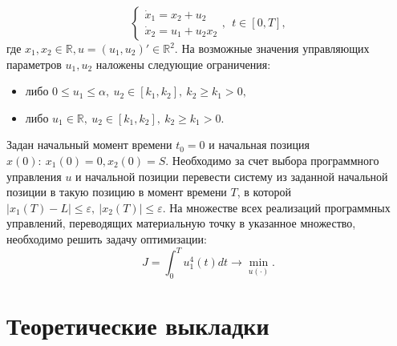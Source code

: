 \documentclass{article}
\begin{document}
\begin{equation}
\label{eq:1}
\begin{cases}
    \dot{x}_1 = x_2+u_2\\
    \dot{x}_2 = u_1+u_2x_2
\end{cases},
~~t\in[0,T],
\end{equation}
где $x_1, x_2 \in \mathbb{R}, u = (u_1, u_2)'\in\mathbb{R}^2.$ На возможные значения управляющих параметров $u_1, u_2$ наложены следующие ограничения:\\
\begin{itemize}
    \item[1.] либо $0 \leqslant u_1 \leqslant \alpha, ~ u_2 \in [k_1, k_2], ~k_2 \geqslant k_1 > 0,$
    \item[2.] либо $u_1 \in \mathbb{R}, ~u_2\in[k_1, k_2], ~k_2\geqslant k_1 >0.$
\end{itemize}
Задан начальный момент времени $t_0 = 0$ и начальная позиция $x(0): ~x_1(0)=0, x_2(0) = S.$ Необходимо за счет выбора программного управления $u$ и начальной позиции перевести систему из заданной начальной позиции в такую позицию в момент времени $T$, в которой $|x_1(T)-L|\leqslant\varepsilon, ~|x_2(T)|\leqslant\varepsilon.$ На множестве всех реализаций программных управлений, переводящих материальную точку в указанное множество, необходимо решить задачу оптимизации:\\
\begin{equation}
\label{eq:2}
    J = \int_0^Tu^4_1(t)dt \rightarrow \min_{u(\cdot)}.
\end{equation}


\newpage
\section{Теоретические выкладки}
\end{document}
